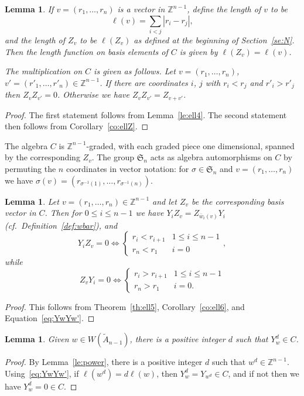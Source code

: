\documentclass[12pt]{amsart}
\renewcommand{\le}{\leqslant}
\newcommand{\sym}[1]{\mathfrak{S}_{#1}}
\newcommand{\bZ}{{\mathbb{Z}}}
\numberwithin{equation}{section}
\newtheorem{lemma}[equation]{Lemma}
\theoremstyle{definition}
\begin{document}
\begin{lemma}\label{le:ZvZv'}
If $v=(r_1,\dots,r_n)$ is a vector in $\bZ^{n-1}$, define the
\emph{length} of $v$ to be 
\[ \ell(v)=\sum_{i<j}|r_i-r_j|, \]
and the length of $Z_v$ to be $\ell(Z_v)$ as defined at the beginning
of Section~\ref{se:N}.
Then the length function on basis elements of $C$ is given by
$\ell(Z_v)=\ell(v)$.

The multiplication on $C$ is given as follows.
Let $v=(r_1,\dots,r_n)$, $v'=(r'_1,\dots,r'_n)\in\bZ^{n-1}$. If there
are coordinates $i$, $j$ with $r_i<r_j$ and $r'_i>r'_j$ then
$Z_vZ_{v'}=0$. Otherwise we have
$Z_vZ_{v'}=Z_{v+v'}$.
\end{lemma}
\begin{proof}
The first statement follows from Lemma~\ref{le:ell4}.
The second statement then follows from Corollary~\ref{co:ellZ}.
\end{proof}


The algebra $C$ is $\bZ^{n-1}$-graded, with each graded piece one
dimensional, spanned by the corresponding $Z_v$. The group
$\sym{n}$ acts as algebra automorphisms on $C$ by permuting the $n$
coordinates in vector notation: for $\sigma\in \sym{n}$ and
$v=(r_1,\dots,r_n)$ we have $\sigma(v)=(r_{\sigma^{-1}(1)},\dots,r_{\sigma^{-1}(n)})$.

\begin{lemma}\label{le:YiZv}
Let $v=(r_1,\dots,r_n)\in\bZ^{n-1}$
and let $Z_v$ be the corresponding basis
vector in $C$. Then for $0\le i\le n-1$ we have 
$Y_iZ_v=Z_{\bar w_i(v)}Y_i$ (cf.~Definition~\ref{def:wbar}), and
\[ Y_iZ_v=0 \Longleftrightarrow\begin{cases}
r_i<r_{i+1}& 1\le i\le n-1\\ r_n<r_1 &i=0\end{cases}, \] 
while
\[ Z_vY_i=0\Longleftrightarrow\begin{cases}
r_i>r_{i+1}&1\le i\le n-1\\r_n>r_1&i=0.\end{cases} \]
\end{lemma}
\begin{proof}
This follows from Theorem~\ref{th:ell5}, Corollary~\ref{co:ell6},
and Equation~\eqref{eq:YwYw'}.
\end{proof}

\begin{lemma}\label{le:Ywd}
Given $w\in W(\tilde A_{n-1})$, there is a positive integer $d$ such
that $Y_w^d\in C$.
\end{lemma}
\begin{proof}
By Lemma~\ref{le:power}, there is a positive integer $d$ such that
$w^d\in\bZ^{n-1}$. Using~\eqref{eq:YwYw'}, 
if $\ell(w^d)=d\ell(w)$, then $Y_w^d=Y_{w^d}\in
C$, and if not then we have $Y_w^d=0\in C$.
\end{proof}
\end{document}
